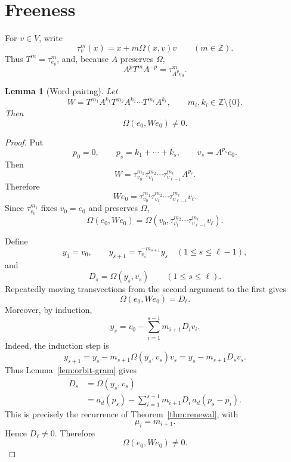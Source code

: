 \documentclass[a4paper,11pt]{amsart}
\newtheorem{lemma}[theorem]{Lemma}
\theoremstyle{remark}
\newcommand{\Z}{\mathbb Z}
\numberwithin{equation}{section}
\begin{document}
\section{Freeness}

For \(v\in V\), write
\[
        \tau_v^m(x)=x+m\Omega(x,v)v
        \qquad(m\in\Z).
\]
Thus \(T^m=\tau_{e_0}^m\), and, because \(A\) preserves \(\Omega\),
\[
        A^pT^mA^{-p}=\tau_{A^pe_0}^m.
\]

\begin{lemma}[Word pairing]\label{lem:word-pairing}
Let
\[
        W=T^{m_1}A^{k_1}T^{m_2}A^{k_2}\cdots T^{m_\ell}A^{k_\ell},
        \qquad
        m_i,k_i\in\Z\setminus\{0\}.
\]
Then
\[
        \Omega(e_0,We_0)\ne0.
\]
\end{lemma}

\begin{proof}
Put
\[
        p_0=0,
        \qquad
        p_s=k_1+\cdots+k_s,
        \qquad
        v_s=A^{p_s}e_0.
\]
Then
\[
        W
        =
        \tau_{v_0}^{m_1}
        \tau_{v_1}^{m_2}
        \cdots
        \tau_{v_{\ell-1}}^{m_\ell}
        A^{p_\ell}.
\]
Therefore
\[
        We_0
        =
        \tau_{v_0}^{m_1}
        \tau_{v_1}^{m_2}
        \cdots
        \tau_{v_{\ell-1}}^{m_\ell}
        v_\ell.
\]
Since \(\tau_{v_0}^{m_1}\) fixes \(v_0=e_0\) and preserves \(\Omega\),
\[
        \Omega(e_0,We_0)
        =
        \Omega\left(v_0,
        \tau_{v_1}^{m_2}\cdots\tau_{v_{\ell-1}}^{m_\ell}v_\ell
        \right).
\]

Define
\[
        y_1=v_0,
        \qquad
        y_{s+1}=\tau_{v_s}^{-m_{s+1}}y_s
        \quad(1\le s\le\ell-1),
\]
and
\[
        D_s=\Omega(y_s,v_s)
        \qquad(1\le s\le\ell).
\]
Repeatedly moving transvections from the second argument to the first gives
\[
        \Omega(e_0,We_0)=D_\ell.
\]
Moreover, by induction,
\[
        y_s
        =
        v_0-\sum_{i=1}^{s-1}m_{i+1}D_i v_i.
\]
Indeed, the induction step is
\[
        y_{s+1}
        =
        y_s-m_{s+1}\Omega(y_s,v_s)v_s
        =
        y_s-m_{s+1}D_sv_s.
\]
Thus Lemma~\ref{lem:orbit-gram} gives
\[
\begin{aligned}
        D_s
        &=
        \Omega(y_s,v_s)                                               \\
        &=
        a_d(p_s)
        -
        \sum_{i=1}^{s-1}m_{i+1}D_i\,a_d(p_s-p_i).
\end{aligned}
\]
This is precisely the recurrence of Theorem~\ref{thm:renewal}, with
\[
        \mu_i=m_{i+1}.
\]
Hence \(D_\ell\ne0\).  Therefore
\[
        \Omega(e_0,We_0)\ne0.
\]
\end{proof}
\end{document}

